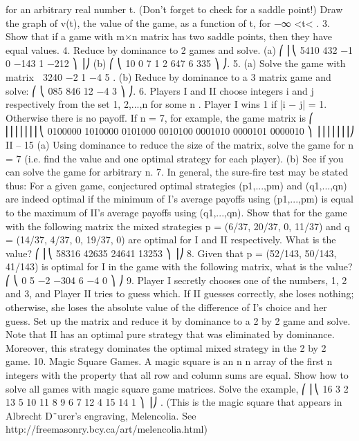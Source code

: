 \documentclass[]{report}
\begin{document}
for an arbitrary real number t. (Don’t forget
to check for a saddle point!) Draw the graph of v(t), the value of the game, as a function
of t, for −∞ <t< \infty.
3. Show that if a game with m×n matrix has two saddle points, then they have equal
values.
4. Reduce by dominance to 2  games and solve.
(a)
⎛
⎜⎝
5410
432 −1
0 −143
1 −212
⎞
⎟⎠ (b)
⎛
⎝
10 0 7 1
2 647
6 335
⎞
⎠.
5. (a) Solve the game with matrix  3240
−2 1 −4 5
.
(b) Reduce by dominance to a 3  matrix game and solve:
⎛
⎝
085
846
12 −4 3
⎞
⎠.
6. Players I and II choose integers i and j respectively from the set {1, 2,...,n} for
some n . Player I wins 1 if |i − j| = 1. Otherwise there is no payoff. If n = 7, for
example, the game matrix is
⎛
⎜⎜⎜⎜⎜⎜⎜⎝
0100000
1010000
0101000
0010100
0001010
0000101
0000010
⎞
⎟⎟⎟⎟⎟⎟⎟⎠
II – 15
(a) Using dominance to reduce the size of the matrix, solve the game for n = 7 (i.e.
find the value and one optimal strategy for each player).
(b) See if you can solve the game for arbitrary n.
7. In general, the sure-fire test may be stated thus: For a given game, conjectured
optimal strategies (p1,...,pm) and (q1,...,qn) are indeed optimal if the minimum of I’s
average payoffs using (p1,...,pm) is equal to the maximum of II’s average payoffs using
(q1,...,qn). Show that for the game with the following matrix the mixed strategies
p = (6/37, 20/37, 0, 11/37) and q = (14/37, 4/37, 0, 19/37, 0) are optimal for I and II respectively.
What is the value?
⎛
⎜⎝
58316
42635
24641
13253
⎞
⎟⎠
8. Given that p = (52/143, 50/143, 41/143) is optimal for I in the game with the
following matrix, what is the value?
⎛
⎝
0 5 −2
−304
6 −4 0
⎞
⎠
9. Player I secretly chooses one of the numbers, 1, 2 and 3, and Player II tries to guess
which. If II guesses correctly, she loses nothing; otherwise, she loses the absolute value of
the difference of I’s choice and her guess. Set up the matrix and reduce it by dominance
to a 2 by 2 game and solve. Note that II has an optimal pure strategy that was eliminated
by dominance. Moreover, this strategy dominates the optimal mixed strategy in the 2 by
2 game.
10. Magic Square Games. A magic square is an n \times n array of the first n integers
with the property that all row and column sums are equal. Show how to solve all games
with magic square game matrices. Solve the example,
⎛
⎜⎝
16 3 2 13
5 10 11 8
9 6 7 12
4 15 14 1
⎞
⎟⎠ .
(This is the magic square that appears in Albrecht D¨urer’s engraving, Melencolia. See
http://freemasonry.bcy.ca/art/melencolia.html)
\end{document}

